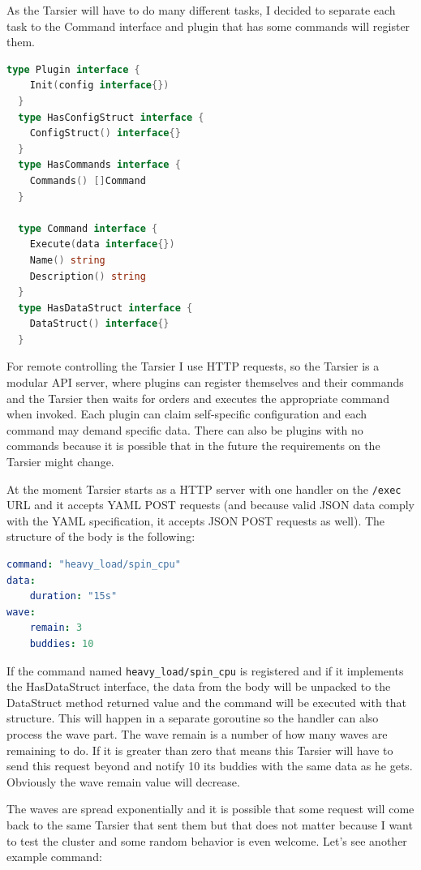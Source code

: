 As the Tarsier will have to do many different tasks, I decided to separate each task to the Command interface and plugin that has some commands will register them.

\begin{lstlisting}[language=go,caption=Tarsier plugin's interfaces]
  type Plugin interface {
  	Init(config interface{})
  }
  type HasConfigStruct interface {
  	ConfigStruct() interface{}
  }
  type HasCommands interface {
  	Commands() []Command
  }
  
  type Command interface {
  	Execute(data interface{})
  	Name() string
  	Description() string
  }
  type HasDataStruct interface {
  	DataStruct() interface{}
  }
\end{lstlisting}

For remote controlling the Tarsier I use HTTP requests, so the Tarsier is a modular API server, where plugins can register themselves and their commands and the Tarsier then waits for orders and executes the appropriate command when invoked. Each plugin can claim self-specific configuration and each command may demand specific data. There can also be plugins with no commands because it is possible that in the future the requirements on the Tarsier might change.

At the moment Tarsier starts as a HTTP server with one handler on the 
\lstinline{/exec} URL and it accepts YAML POST requests (and because valid JSON data comply with the YAML specification, it accepts JSON POST requests as well). The structure of the body is the following:
\pagebreak
\begin{lstlisting}[language=yaml,caption=Command 'spin\_cpu' body structure]
command: "heavy_load/spin_cpu"
data:
    duration: "15s"
wave: 
    remain: 3
    buddies: 10
\end{lstlisting}


If the command named \lstinline{heavy_load/spin_cpu} is registered and if it implements the HasDataStruct interface, the data from the body will be unpacked to the DataStruct method returned value and the command will be executed with that structure. This will happen in a separate goroutine so the handler can also process the wave part. The wave remain is a number of how many waves are remaining to do. If it is greater than zero that means this Tarsier will have to send this request beyond and notify 10 its buddies with the same data as he gets. Obviously the wave remain value will decrease.

The waves are spread exponentially and it is possible that some request will come back to the same Tarsier that sent them but that does not matter because I want to test the cluster and some random behavior is even welcome. Let’s see another example command:
 
